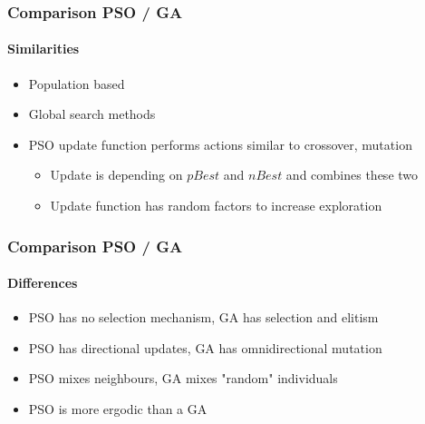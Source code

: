 \documentclass{beamer}
\begin{document}
\begin{frame}[fragile]
  \frametitle{Comparison PSO / GA}
  \framesubtitle{Similarities}
  \begin{itemize}
    \item Population based
    \item Global search methods
    \item PSO update function performs actions similar to crossover, mutation
    \begin{itemize}
      \item Update is depending on $pBest$ and $nBest$ and combines these two
      \item Update function has random factors to increase exploration
    \end{itemize}
  \end{itemize}
\end{frame}

\begin{frame}[fragile]
  \frametitle{Comparison PSO / GA}
  \framesubtitle{Differences}
  \begin{itemize}
    \item PSO has no selection mechanism, GA has selection and elitism
    \item PSO has directional updates, GA has omnidirectional mutation
    \item PSO mixes neighbours, GA mixes "random" individuals
    \item PSO is more ergodic than a GA
  \end{itemize}
\end{frame}
\end{document}

